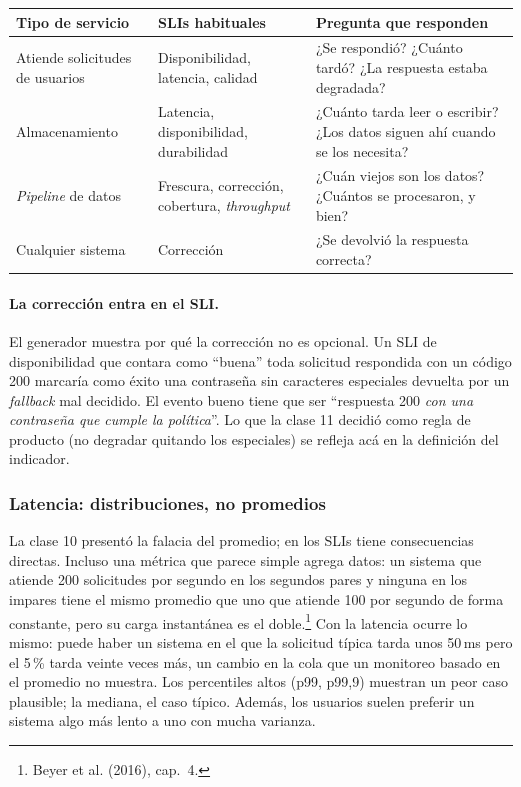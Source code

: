 \documentclass[variant=apuntes,cover=institutional,mode=screen]{ua-engineering-v6-article}
\begin{document}
\begin{center}
\begin{tabular}{p{}p{}p{}}
\toprule
\textbf{Tipo de servicio} & \textbf{SLIs habituales} & \textbf{Pregunta que responden} \\
\midrule
Atiende solicitudes de usuarios & Disponibilidad, latencia, calidad & ¿Se respondió? ¿Cuánto tardó? ¿La respuesta estaba degradada? \\
Almacenamiento & Latencia, disponibilidad, durabilidad & ¿Cuánto tarda leer o escribir? ¿Los datos siguen ahí cuando se los necesita? \\
\emph{Pipeline} de datos & Frescura, corrección, cobertura, \emph{throughput} & ¿Cuán viejos son los datos? ¿Cuántos se procesaron, y bien? \\
Cualquier sistema & Corrección & ¿Se devolvió la respuesta correcta? \\
\bottomrule
\end{tabular}
\end{center}

\paragraph{La corrección entra en el SLI.} El generador muestra por qué la corrección no es opcional. Un SLI de disponibilidad que contara como ``buena'' toda solicitud respondida con un código 200 marcaría como éxito una contraseña sin caracteres especiales devuelta por un \emph{fallback} mal decidido. El evento bueno tiene que ser ``respuesta 200 \emph{con una contraseña que cumple la política}''. Lo que la clase 11 decidió como regla de producto (no degradar quitando los especiales) se refleja acá en la definición del indicador.

\subsubsection{Latencia: distribuciones, no promedios}\label{sec:latencia}

La clase 10 presentó la falacia del promedio; en los SLIs tiene consecuencias directas. Incluso una métrica que parece simple agrega datos: un sistema que atiende 200 solicitudes por segundo en los segundos pares y ninguna en los impares tiene el mismo promedio que uno que atiende 100 por segundo de forma constante, pero su carga instantánea es el doble.\footnote{Beyer et al. (2016), cap.~4.} Con la latencia ocurre lo mismo: puede haber un sistema en el que la solicitud típica tarda unos 50\,ms pero el 5\,\% tarda veinte veces más, un cambio en la cola que un monitoreo basado en el promedio no muestra. Los percentiles altos (p99, p99,9) muestran un peor caso plausible; la mediana, el caso típico. Además, los usuarios suelen preferir un sistema algo más lento a uno con mucha varianza.
\end{document}
